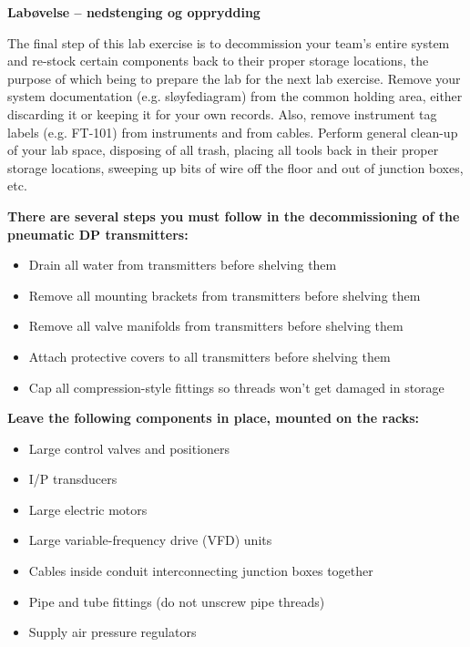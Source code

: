 {{\vfil \eject

\noindent
{\bf Labøvelse -- nedstenging og opprydding}

\vskip 5pt

The final step of this lab exercise is to decommission your team's entire system and re-stock certain components back to their proper storage locations, the purpose of which being to prepare the lab for the next lab exercise.  Remove your system documentation (e.g. sløyfediagram) from the common holding area, either discarding it or keeping it for your own records.  Also, remove instrument tag labels (e.g. FT-101) from instruments and from cables.  Perform general clean-up of your lab space, disposing of all trash, placing all tools back in their proper storage locations, sweeping up bits of wire off the floor and out of junction boxes, etc.

\vskip 10pt

\noindent
{\bf There are several steps you must follow in the decommissioning of the pneumatic DP transmitters:}

\begin{itemize}
\item{} Drain all water from transmitters before shelving them
\item{} Remove all mounting brackets from transmitters before shelving them
\item{} Remove all valve manifolds from transmitters before shelving them
\item{} Attach protective covers to all transmitters before shelving them
\item{} Cap all compression-style fittings so threads won't get damaged in storage
\end{itemize}


\vskip 10pt

\indent
{\bf Leave the following components in place, mounted on the racks:}

\begin{itemize}
\item{} Large control valves and positioners
\item{} I/P transducers
\item{} Large electric motors
\item{} Large variable-frequency drive (VFD) units
\item{} Cables inside conduit interconnecting junction boxes together
\item{} Pipe and tube fittings (do not unscrew pipe threads)
\item{} Supply air pressure regulators
\end{itemize}

}}
